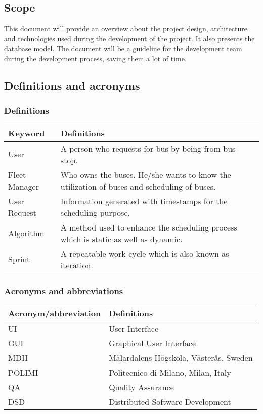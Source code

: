 \subsection{Scope} 
This document will provide an overview about the project design, architecture and technologies used during the development of the project. It also presents the database model.
The document will be a guideline for the development team during the development process, saving them a lot of time.  
\subsection{Definitions and acronyms}
\subsubsection{Definitions} 
\begin{center}
	\begin{tabular} { | m{3cm} | m{10cm} | }
		\hline
		\textbf{Keyword} & \textbf{Definitions}\\
		\hline
		User & A person who requests for bus by being from bus stop.\\
		\hline
		Fleet Manager & Who owns the buses. He/she wants to know the utilization of buses and scheduling of buses.\\
		\hline
		User Request & Information generated with timestamps for the scheduling purpose.\\
		\hline
		Algorithm & A method used to enhance the scheduling process which is static as well as dynamic.\\
		\hline
		Sprint & A repeatable work cycle which is also known as iteration.\\
		\hline
	\end{tabular}
\end{center}
\subsubsection{Acronyms and abbreviations}
\begin{center}
	\begin{tabular} { | m{5cm} | m{8cm} | }
		\hline
		\textbf{Acronym/abbreviation} & \textbf{Definitions}\\
		\hline
		UI & User Interface\\
		\hline
		GUI & Graphical User Interface\\
		\hline
		MDH & Mälardalens Högskola, Västerås, Sweden\\
		\hline
		POLIMI & Politecnico di Milano, Milan, Italy\\
		\hline
		QA & Quality Assurance\\
		\hline
		DSD & Distributed Software Development\\
		\hline
	\end{tabular}
\end{center}